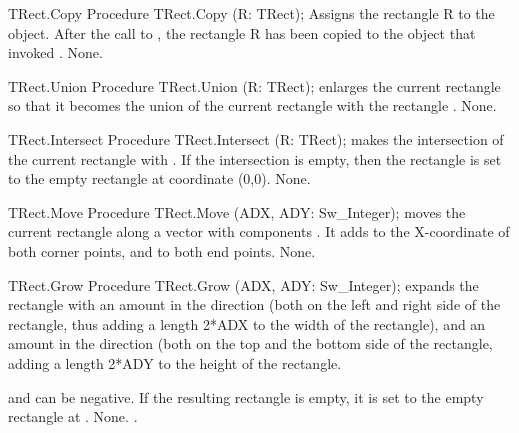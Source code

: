 \begin{procedure}{TRect.Copy}
\Declaration     
Procedure TRect.Copy (R: TRect);
\Description
Assigns the rectangle R to the object. After the call to , the
rectangle R has been copied to the object that invoked .
\Errors
None.
\SeeAlso
{}
\end{procedure}

\html{}

\begin{procedure}{TRect.Union}
\Declaration
Procedure TRect.Union (R: TRect);
\Description
{} enlarges the current rectangle so that it becomes the union
of the current rectangle with the rectangle .
\Errors
None.
\SeeAlso
{}
\end{procedure}

\html{}

\begin{procedure}{TRect.Intersect}
\Declaration
Procedure TRect.Intersect (R: TRect);
\Description
{} makes the intersection of the current rectangle with
. If the intersection is empty, then the rectangle is set to the empty
rectangle at coordinate (0,0).
\Errors
None.
\SeeAlso
{}
\end{procedure}

\html{}

\begin{procedure}{TRect.Move}
\Declaration
Procedure TRect.Move (ADX, ADY: Sw\_Integer);
\Description
{} moves the current rectangle along a vector with components
. It adds  to the X-coordinate of both corner
points, and  to both end points.
\Errors
None.
\SeeAlso
{}
\end{procedure}

\html{}

\begin{procedure}{TRect.Grow}
\Declaration
Procedure TRect.Grow (ADX, ADY: Sw\_Integer);
\Description
{} expands the rectangle with an amount  in the 
direction (both on the left and right side of the rectangle, thus adding a 
length 2*ADX to the width of the rectangle), and an amount  in 
the  direction (both on the top and the bottom side of the rectangle,
adding a length 2*ADY to the height of the rectangle. 

 and  can be negative. If the resulting rectangle is empty, it is set 
to the empty rectangle at .
\Errors
None.
\SeeAlso
{}.
\end{procedure}



